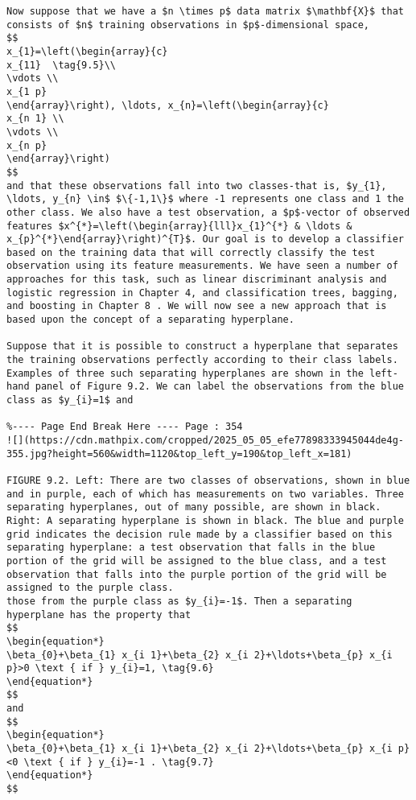 \documentclass[10pt]{article}
\begin{document}
\begin{verbatim}
Now suppose that we have a $n \times p$ data matrix $\mathbf{X}$ that consists of $n$ training observations in $p$-dimensional space,
$$
x_{1}=\left(\begin{array}{c}
x_{11}  \tag{9.5}\\
\vdots \\
x_{1 p}
\end{array}\right), \ldots, x_{n}=\left(\begin{array}{c}
x_{n 1} \\
\vdots \\
x_{n p}
\end{array}\right)
$$
and that these observations fall into two classes-that is, $y_{1}, \ldots, y_{n} \in$ $\{-1,1\}$ where -1 represents one class and 1 the other class. We also have a test observation, a $p$-vector of observed features $x^{*}=\left(\begin{array}{lll}x_{1}^{*} & \ldots & x_{p}^{*}\end{array}\right)^{T}$. Our goal is to develop a classifier based on the training data that will correctly classify the test observation using its feature measurements. We have seen a number of approaches for this task, such as linear discriminant analysis and logistic regression in Chapter 4, and classification trees, bagging, and boosting in Chapter 8 . We will now see a new approach that is based upon the concept of a separating hyperplane.

Suppose that it is possible to construct a hyperplane that separates the training observations perfectly according to their class labels. Examples of three such separating hyperplanes are shown in the left-hand panel of Figure 9.2. We can label the observations from the blue class as $y_{i}=1$ and

%---- Page End Break Here ---- Page : 354
![](https://cdn.mathpix.com/cropped/2025_05_05_efe77898333945044de4g-355.jpg?height=560&width=1120&top_left_y=190&top_left_x=181)

FIGURE 9.2. Left: There are two classes of observations, shown in blue and in purple, each of which has measurements on two variables. Three separating hyperplanes, out of many possible, are shown in black. Right: A separating hyperplane is shown in black. The blue and purple grid indicates the decision rule made by a classifier based on this separating hyperplane: a test observation that falls in the blue portion of the grid will be assigned to the blue class, and a test observation that falls into the purple portion of the grid will be assigned to the purple class.
those from the purple class as $y_{i}=-1$. Then a separating hyperplane has the property that
$$
\begin{equation*}
\beta_{0}+\beta_{1} x_{i 1}+\beta_{2} x_{i 2}+\ldots+\beta_{p} x_{i p}>0 \text { if } y_{i}=1, \tag{9.6}
\end{equation*}
$$
and
$$
\begin{equation*}
\beta_{0}+\beta_{1} x_{i 1}+\beta_{2} x_{i 2}+\ldots+\beta_{p} x_{i p}<0 \text { if } y_{i}=-1 . \tag{9.7}
\end{equation*}
$$


\end{verbatim}
\end{document}

